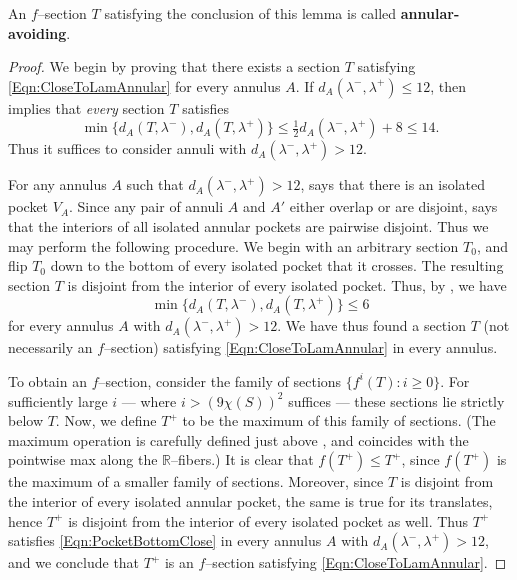 \documentclass[11pt,letterpaper]{amsart}
\newcommand{\RR}[0]{\mathbb{R}}
\numberwithin{equation}{section}
\theoremstyle{definition}
\newcommand{\define}[1]{\textbf{#1}}
\begin{document}
An $f$--section $T$ satisfying the conclusion of this lemma is called \define{annular-avoiding}.


\begin{proof}
We begin by proving that there exists a section $T$ satisfying \eqref{Eqn:CloseToLamAnnular} for every annulus $A$.
If $d_A(\lambda^-, \lambda^+) \leq 12$, then  implies that \emph{every} section $T$ satisfies 
\[
\min \{d_A(T, \lambda^-), d_A(T, \lambda^+)\} \leq \tfrac{1}{2} d_A(\lambda^-, \lambda^+) + 8 \leq 14.
\]
 Thus it suffices to consider annuli with $d_A(\lambda^-, \lambda^+) > 12$.

For any annulus $A$ such that $d_A(\lambda^-, \lambda^+) > 12$,  says that there is an isolated pocket $V_A$. Since any pair of annuli $A$ and $A'$ either overlap or are disjoint,  says that  the interiors of all isolated annular pockets are pairwise disjoint. Thus we may perform the following procedure. We begin with an arbitrary section $T_0$, and flip $T_0$ down to the bottom of every isolated pocket that it crosses. The resulting section $T$ is disjoint from the interior of every isolated pocket. Thus, by , we have 
\begin{equation}\label{Eqn:PocketBottomClose}
\min \big\{ d_A(T, \lambda^-), d_A(T, \lambda^+) \big\} \leq 6
\end{equation}
for every annulus $A$ with $d_A(\lambda^-, \lambda^+) > 12$. We have thus found a section $T$  (not necessarily an $f$--section) satisfying \eqref{Eqn:CloseToLamAnnular} in every annulus.



To obtain an $f$--section, consider the family of sections $\{ f^i(T): i \geq 0 \}$. For sufficiently large $i$ --- where $i > (9 \chi(S))^2$ suffices --- these sections lie strictly below $T$. Now, we define $T^+$ to be the maximum of this family of sections. (The maximum operation is carefully defined just above \cite[Lemma 3.2]{MinskyTaylor:SubsurfaceDist}, and coincides with the pointwise max along the $\RR$--fibers.)
It is clear that $f(T^+) \leq T^+$, since $f(T^+)$ is the maximum of a smaller family of sections. Moreover, since $T$ is disjoint from the interior of every isolated annular pocket, the same is true for its translates, hence $T^+$ is disjoint from the interior of every isolated pocket as well. Thus $T^+$ satisfies \eqref{Eqn:PocketBottomClose} in every annulus $A$ with $d_A(\lambda^-, \lambda^+) > 12$, and we conclude that $T^+$ is an $f$--section satisfying \eqref{Eqn:CloseToLamAnnular}.


\end{proof}
\end{document}
